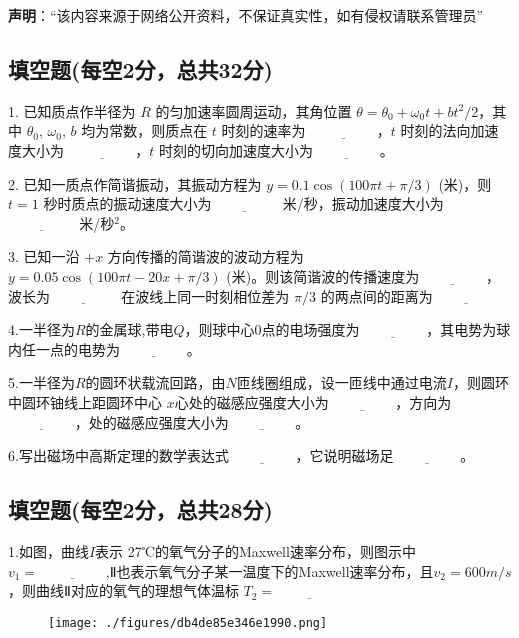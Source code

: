
\textbf{声明}：“该内容来源于网络公开资料，不保证真实性，如有侵权请联系管理员”

\subsection{填空题(每空2分，总共32分)}

1. 已知质点作半径为 \( R \) 的匀加速率圆周运动，其角位置 \( \theta = \theta_0 + \omega_0 t + bt^2/2 \)，其中 \( \theta_0 \), \( \omega_0 \), \( b \) 均为常数，则质点在 \( t \) 时刻的速率为 $\underline{\hspace{2cm}}$，\( t \) 时刻的法向加速度大小为 $\underline{\hspace{2cm}}$，\( t \) 时刻的切向加速度大小为$\underline{\hspace{2cm}}$。

2. 已知一质点作简谐振动，其振动方程为 \( y = 0.1 \cos (100\pi t + \pi/3) \) (米)，则 \( t = 1 \) 秒时质点的振动速度大小为$\underline{\hspace{2cm}}$ 米/秒，振动加速度大小为 $\underline{\hspace{2cm}}$ 米/秒\(^2\)。

3. 已知一沿 $ +x $ 方向传播的简谐波的波动方程为$y = 0.05 \cos (100\pi t - 20x + \pi/3)$ (米)。则该简谐波的传播速度为$\underline{\hspace{2cm}}$，波长为$\underline{\hspace{2cm}}$ 在波线上同一时刻相位差为 $\pi/3$ 的两点间的距离为$\underline{\hspace{2cm}}$

4.一半径为$R$的金属球,带电$Q$，则球中心0点的电场强度为$\underline{\hspace{2cm}}$，其电势为球内任一点的电势为$\underline{\hspace{2cm}}$。

5.一半径为$R$的圆环状载流回路，由$N$匝线圈组成，设一匝线中通过电流$I$，则圆环中圆环铀线上距圆环中心 $x$心处的磁感应强度大小为$\underline{\hspace{2cm}}$，方向为$\underline{\hspace{2cm}}$，处的磁感应强度大小为$\underline{\hspace{2cm}}$。

6.写出磁场中高斯定理的数学表达式$\underline{\hspace{2cm}}$，它说明磁场足$\underline{\hspace{2cm}}$。
\subsection{填空题(每空2分，总共28分)}
1.如图，曲线$I$表示 27℃的氧气分子的Maxwell速率分布，则图示中 $v_1=\underline{\hspace{2cm}}$,Ⅱ也表示氧气分子某一温度下的Maxwell速率分布，且$v_2=600m/s$，则曲线Ⅱ对应的氧气的理想气体温标 $T_2=\underline{\hspace{2cm}}$
\begin{figure}[ht]
\centering
\texttt{[image: ./figures/db4de85e346e1990.png]}
\caption{} \label{fig_NJU_1}
\end{figure}

